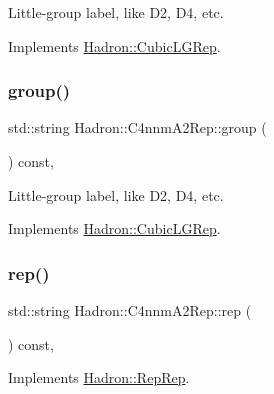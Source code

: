 Little-\/group label, like D2, D4, etc. 

Implements \mbox{\hyperlink{structHadron_1_1CubicLGRep_a9bdb14b519a611d21379ed96a3a9eb41}{Hadron\+::\+Cubic\+L\+G\+Rep}}.

\mbox{\label{structHadron_1_1C4nnmA2Rep_ae6a2ff8ed8fcc3e34ed1e46e493195ed}} 
\subsubsection{\texorpdfstring{group()}{group()}\hspace{0.1cm}{\footnotesize\ttfamily [3/3]}}
{\footnotesize\ttfamily std\+::string Hadron\+::\+C4nnm\+A2\+Rep\+::group (\begin{DoxyParamCaption}{ }\end{DoxyParamCaption}) const\hspace{0.3cm}{\ttfamily [inline]}, {\ttfamily [virtual]}}

Little-\/group label, like D2, D4, etc. 

Implements \mbox{\hyperlink{structHadron_1_1CubicLGRep_a9bdb14b519a611d21379ed96a3a9eb41}{Hadron\+::\+Cubic\+L\+G\+Rep}}.

\mbox{\label{structHadron_1_1C4nnmA2Rep_a087273219d3b72971b2891ff00719c5a}} 
\subsubsection{\texorpdfstring{rep()}{rep()}\hspace{0.1cm}{\footnotesize\ttfamily [1/3]}}
{\footnotesize\ttfamily std\+::string Hadron\+::\+C4nnm\+A2\+Rep\+::rep (\begin{DoxyParamCaption}{ }\end{DoxyParamCaption}) const\hspace{0.3cm}{\ttfamily [inline]}, {\ttfamily [virtual]}}



Implements \mbox{\hyperlink{structHadron_1_1RepRep_ab3213025f6de249f7095892109575fde}{Hadron\+::\+Rep\+Rep}}.

\mbox{\label{structHadron_1_1C4nnmA2Rep_a087273219d3b72971b2891ff00719c5a}} 

